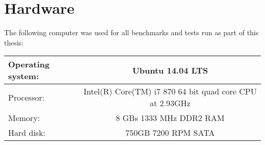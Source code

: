 \medskip

\begin{comment}

\begin{itemize}

\item Formalise the DPLL proof system and a proof of its completeness.

\item Extract a standard DPLL SAT algorithm from the formalisation into a functional programming language and test its performance

\item Modify the formalisation and completeness proof  of the DPLL proof system so that it captures the behaviour conflict driven clause learning SAT algorithms.

\item Extract a clause learning SAT algorithm from the formalisation  of the modified DPLL proof system and show that clause learning increases the efficiency of the solver.

\item Apply verified SAT algorithms to the verification of solid state railway interlocking programs. 

\end{itemize}

Our second set of results is in regard to the formal specification and verification of the European Rail Traffic Management System (ERTMS) using Real Time Maude.

\begin{itemize}

\item Formalise ERTMS as a hybrid automata.

\item Formalise and Model ERTMS as a Real Time Maude specification.

\item Verify ERTMS using Real Time Maude's linear temporal logic model checker.

\end{itemize}


\end{comment}


\section{Hardware}
The following computer was used for all benchmarks and tests run as part of this thesis:
\begin{center}
\begin{tabular}{| l | c |} \hline
Operating system: & Ubuntu 14.04 LTS  \\ \hline
Processor: & Intel(R) Core(TM) i7 870 64 bit quad core CPU at 2.93GHz  \\ \hline 
Memory: & 8 GBs 1333 MHz DDR2 RAM \\ \hline
Hard disk: &  750GB 7200 RPM  SATA\\  \hline 
\end{tabular}
\end{center}

